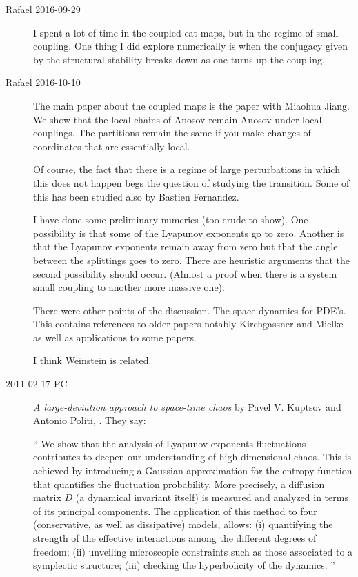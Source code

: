 \begin{description}
\item[Rafael 2016-09-29]
I spent a lot of time in the coupled cat maps, but in the regime of small
coupling. One thing I did explore numerically is when the conjugacy given
by the structural stability breaks down as one turns up the coupling.

\item[Rafael 2016-10-10]
The main paper about the coupled maps is the paper with Miaohua Jiang. We
show that the local chains of Anosov remain Anosov under local couplings.
The partitions remain the same if you make changes of coordinates that
are essentially local.

Of course, the fact that there is a regime of large perturbations in
which this does not happen begs the question of studying the transition.
Some of this has been studied also by Bastien Fernandez.

I have done some preliminary numerics (too crude to show). One
possibility is that some of the Lyapunov exponents go to zero. Another is
that the Lyapunov exponents remain away from zero but that the angle
between the splittings goes to zero. There are heuristic arguments that
the second possibility should occur. (Almost a proof when there is a
system small coupling to another more massive one).

There were other points of the discussion. The space dynamics for PDE's.
This contains references to older papers notably Kirchgassner and Mielke
as well as applications to some papers.

I think Weinstein is related.

\item[2011-02-17 PC]
\emph{A large-deviation approach to space-time chaos}
by  Pavel V. Kuptsov and Antonio Politi,
. They say:

``
We show that the analysis of Lyapunov-exponents fluctuations
contributes to deepen our understanding of high-dimensional chaos. This is
achieved by introducing a Gaussian approximation for the entropy function that
quantifies the fluctuation probability. More precisely, a diffusion matrix $D$ (a
dynamical invariant itself) is measured and analyzed in terms of its principal
components. The application of this method to four (conservative, as well as
dissipative) models, allows: (i) quantifying the strength of the effective
interactions among the different degrees of freedom; (ii) unveiling microscopic
constraints such as those associated to a symplectic structure; (iii) checking
the hyperbolicity of the dynamics.
''


\end{description}
